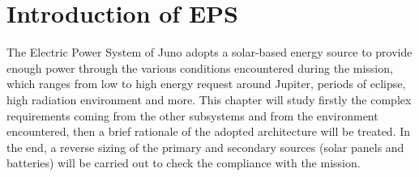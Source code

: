 \section{Introduction of EPS}
\label{sec:EPS_introduction}

The Electric Power System of Juno adopts a solar-based energy source to provide enough power through the various conditions encountered during the mission, which ranges from low to high energy request around Jupiter, periods of eclipse, high radiation environment and more.
This chapter will study firstly the complex requirements coming from the other subsystems and from the environment encountered, then a brief rationale of the adopted architecture will be treated.
In the end, a reverse sizing of the primary and secondary sources (solar panels and batteries) will be carried out to check the compliance with the mission.